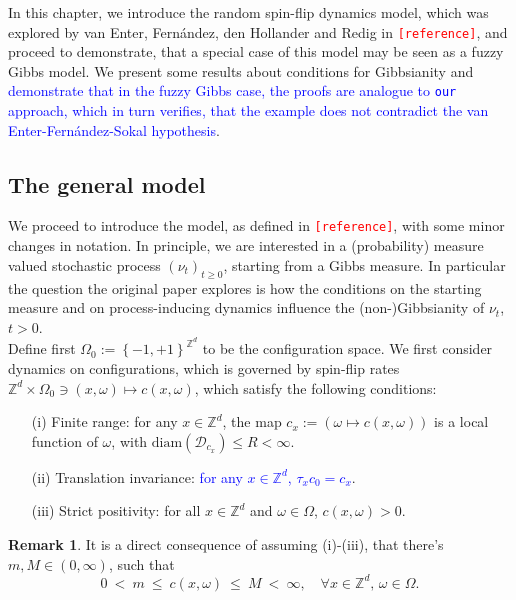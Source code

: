 \documentclass[12pt]{article}
\newcommand{\D}{\mathcal{D}}
\newcommand{\Z}{\mathbb{Z}}
\newcommand{\set}[1]{\left\{#1\right\}}
\newcommand{\1}{\mathbbm{1}}
\newcommand{\5}{\vspace{0.5cm}}
\theoremstyle{definition}
\newtheorem{rem}[thm]{Remark}
\begin{document}
In this chapter, we introduce the random spin-flip dynamics model, which was explored by van Enter, Fern\'andez, den Hollander and Redig in \textcolor{red}{\texttt{[reference]}}, and proceed to demonstrate, that a special case of this model may be seen as a fuzzy Gibbs model. We present some results about conditions for Gibbsianity and \textcolor{blue}{demonstrate that in the fuzzy Gibbs case, the proofs are analogue to \texttt{our} approach, which in turn verifies, that the example does not contradict the van Enter-Fern\'andez-Sokal hypothesis}.


\subsection{The general model}

We proceed to introduce the model, as defined in \textcolor{red}{\texttt{[reference]}}, with some minor changes in notation. In principle, we are interested in a (probability) measure valued stochastic process $(\nu_t)_{t\geq 0}$, starting from a Gibbs measure. In particular the question the original paper explores is how the conditions on the starting measure and on process-inducing dynamics influence the (non-)Gibbsianity of $\nu_t$, $t>0$. \\

Define first $\Omega_0:=\set{-1,+1}^{\Z^d}$ to be the configuration space. We first consider dynamics on configurations, which is governed by spin-flip rates $\Z^d\times\Omega_0\ni(x,\omega)\mapsto c(x,\omega)$, which satisfy the following conditions:
\begin{itemize}
	\item[(i)] Finite range: for any $x\in\Z^d$, the map $c_x:=(\omega\mapsto c(x,\omega))$ is a local function of $\omega$, with $\mathrm{diam}(\D_{c_x})\leq R<\infty$.
	\item[(ii)] Translation invariance: \textcolor{blue}{for any $x\in\Z^d$, $\tau_x c_0=c_x$}. %
	\item[(iii)] Strict positivity: for all $x\in\Z^d$ and $\omega\in\Omega$, $c(x,\omega)>0$.
\end{itemize}

\begin{rem}
It is a direct consequence of assuming (i)-(iii), that there's $m,M\in(0,\infty)$, such that 
$$0 ~<~ m ~\leq~ c(x,\omega) ~\leq~ M ~<~ \infty, \quad \forall x\in\Z^d,\,\omega\in\Omega.$$
\end{rem}
\end{document}
